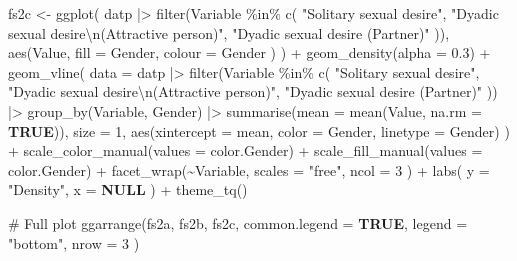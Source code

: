 \documentclass[
  bookmarksnumbered]{article}
\newenvironment{Shaded}{\begin{snugshade}}{\end{snugshade}}
\newcommand{\AttributeTok}[1]{\textcolor[rgb]{0.80,0.80,0.80}{#1}}
\newcommand{\CommentTok}[1]{\textcolor[rgb]{0.50,0.62,0.50}{#1}}
\newcommand{\ConstantTok}[1]{\textcolor[rgb]{0.86,0.64,0.64}{\textbf{#1}}}
\newcommand{\DecValTok}[1]{\textcolor[rgb]{0.86,0.86,0.80}{#1}}
\newcommand{\FloatTok}[1]{\textcolor[rgb]{0.75,0.75,0.82}{#1}}
\newcommand{\FunctionTok}[1]{\textcolor[rgb]{0.94,0.94,0.56}{#1}}
\newcommand{\NormalTok}[1]{\textcolor[rgb]{0.80,0.80,0.80}{#1}}
\newcommand{\OtherTok}[1]{\textcolor[rgb]{0.94,0.94,0.56}{#1}}
\newcommand{\SpecialCharTok}[1]{\textcolor[rgb]{0.86,0.64,0.64}{#1}}
\newcommand{\StringTok}[1]{\textcolor[rgb]{0.80,0.58,0.58}{#1}}
\begin{document}
\begin{Shaded}
\begin{Highlighting}[]
\NormalTok{fs2c }\OtherTok{\textless{}{-}} \FunctionTok{ggplot}\NormalTok{(}
\NormalTok{  datp }\SpecialCharTok{|\textgreater{}}
    \FunctionTok{filter}\NormalTok{(Variable }\SpecialCharTok{\%in\%} \FunctionTok{c}\NormalTok{(}
      \StringTok{"Solitary sexual desire"}\NormalTok{,}
      \StringTok{"Dyadic sexual desire}\SpecialCharTok{\textbackslash{}n}\StringTok{(Attractive person)"}\NormalTok{,}
      \StringTok{"Dyadic sexual desire (Partner)"}
\NormalTok{    )),}
  \FunctionTok{aes}\NormalTok{(Value,}
    \AttributeTok{fill =}\NormalTok{ Gender,}
    \AttributeTok{colour =}\NormalTok{ Gender}
\NormalTok{  )}
\NormalTok{) }\SpecialCharTok{+}
  \FunctionTok{geom\_density}\NormalTok{(}\AttributeTok{alpha =} \FloatTok{0.3}\NormalTok{) }\SpecialCharTok{+}
  \FunctionTok{geom\_vline}\NormalTok{(}
    \AttributeTok{data =}\NormalTok{ datp }\SpecialCharTok{|\textgreater{}}
      \FunctionTok{filter}\NormalTok{(Variable }\SpecialCharTok{\%in\%} \FunctionTok{c}\NormalTok{(}
        \StringTok{"Solitary sexual desire"}\NormalTok{,}
        \StringTok{"Dyadic sexual desire}\SpecialCharTok{\textbackslash{}n}\StringTok{(Attractive person)"}\NormalTok{,}
        \StringTok{"Dyadic sexual desire (Partner)"}
\NormalTok{      )) }\SpecialCharTok{|\textgreater{}}
      \FunctionTok{group\_by}\NormalTok{(Variable, Gender) }\SpecialCharTok{|\textgreater{}}
      \FunctionTok{summarise}\NormalTok{(}\AttributeTok{mean =} \FunctionTok{mean}\NormalTok{(Value, }\AttributeTok{na.rm =} \ConstantTok{TRUE}\NormalTok{)),}
    \AttributeTok{size =} \DecValTok{1}\NormalTok{,}
    \FunctionTok{aes}\NormalTok{(}\AttributeTok{xintercept =}\NormalTok{ mean, }\AttributeTok{color =}\NormalTok{ Gender, }\AttributeTok{linetype =}\NormalTok{ Gender)}
\NormalTok{  ) }\SpecialCharTok{+}
  \FunctionTok{scale\_color\_manual}\NormalTok{(}\AttributeTok{values =}\NormalTok{ color.Gender) }\SpecialCharTok{+}
  \FunctionTok{scale\_fill\_manual}\NormalTok{(}\AttributeTok{values =}\NormalTok{ color.Gender) }\SpecialCharTok{+}
  \FunctionTok{facet\_wrap}\NormalTok{(}\SpecialCharTok{\textasciitilde{}}\NormalTok{Variable,}
    \AttributeTok{scales =} \StringTok{"free"}\NormalTok{,}
    \AttributeTok{ncol =} \DecValTok{3}
\NormalTok{  ) }\SpecialCharTok{+}
  \FunctionTok{labs}\NormalTok{(}
    \AttributeTok{y =} \StringTok{"Density"}\NormalTok{,}
    \AttributeTok{x =} \ConstantTok{NULL}
\NormalTok{  ) }\SpecialCharTok{+}
  \FunctionTok{theme\_tq}\NormalTok{()}

\CommentTok{\# Full plot}
\FunctionTok{ggarrange}\NormalTok{(fs2a, fs2b, fs2c,}
  \AttributeTok{common.legend =} \ConstantTok{TRUE}\NormalTok{,}
  \AttributeTok{legend =} \StringTok{"bottom"}\NormalTok{,}
  \AttributeTok{nrow =} \DecValTok{3}
\NormalTok{)}
\end{Highlighting}
\end{Shaded}
\end{document}
